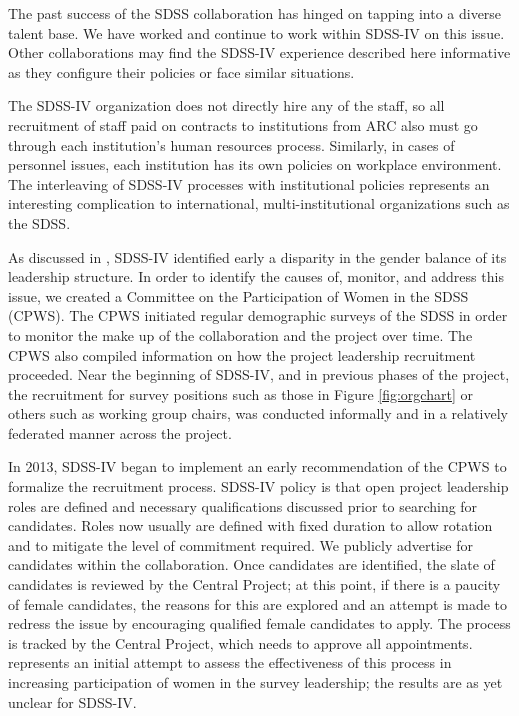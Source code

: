 
The past success of the SDSS collaboration has hinged on tapping into
a diverse talent base. We have worked and continue to work within
SDSS-IV on this issue. Other collaborations may find the SDSS-IV
experience described here informative as they configure their policies
or face similar situations.

The SDSS-IV organization does not directly hire any of the staff, so
all recruitment of staff paid on contracts to institutions from ARC
also must go through each institution's human resources
process. Similarly, in cases of personnel issues, each institution has
its own policies on workplace environment.  The interleaving of
SDSS-IV processes with institutional policies represents an
interesting complication to international, multi-institutional
organizations such as the SDSS.

As discussed in \citet{lundgren15a}, SDSS-IV identified early a
disparity in the gender balance of its leadership structure. In order
to identify the causes of, monitor, and address this issue, we created
a Committee on the Participation of Women in the SDSS (CPWS). The CPWS
initiated regular demographic surveys of the SDSS in order to monitor
the make up of the collaboration and the project over time.  The CPWS
also compiled information on how the project leadership recruitment
proceeded. Near the beginning of SDSS-IV, and in previous phases of
the project, the recruitment for survey positions such as those in
Figure \ref{fig:orgchart} or others such as working group chairs, was
conducted informally and in a relatively federated manner across the
project.

In 2013, SDSS-IV began to implement an early recommendation of the
CPWS to formalize the recruitment process. SDSS-IV policy is that open
project leadership roles are defined and necessary qualifications
discussed prior to searching for candidates.  Roles now usually are
defined with fixed duration to allow rotation and to mitigate the
level of commitment required.  We publicly advertise for candidates
within the collaboration.  Once candidates are identified, the slate
of candidates is reviewed by the Central Project; at this point, if
there is a paucity of female candidates, the reasons for this are
explored and an attempt is made to redress the issue by encouraging
qualified female candidates to apply. The process is tracked by the
Central Project, which needs to approve all appointments.
\citet{lundgren15a} represents an initial attempt to
assess the effectiveness of this process in increasing participation
of women in the survey leadership; the results are as yet unclear for
SDSS-IV.

